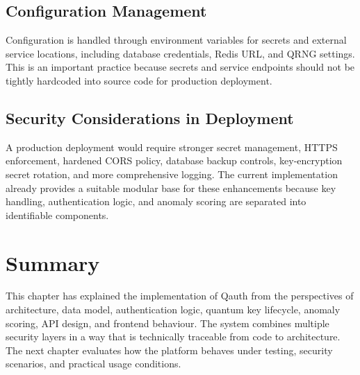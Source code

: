 \subsection{Configuration Management}
Configuration is handled through environment variables for secrets and external service locations, including database credentials, Redis URL, and QRNG settings. This is an important practice because secrets and service endpoints should not be tightly hardcoded into source code for production deployment.

\subsection{Security Considerations in Deployment}
A production deployment would require stronger secret management, HTTPS enforcement, hardened CORS policy, database backup controls, key-encryption secret rotation, and more comprehensive logging. The current implementation already provides a suitable modular base for these enhancements because key handling, authentication logic, and anomaly scoring are separated into identifiable components.

\section{Summary}
This chapter has explained the implementation of Qauth from the perspectives of architecture, data model, authentication logic, quantum key lifecycle, anomaly scoring, API design, and frontend behaviour. The system combines multiple security layers in a way that is technically traceable from code to architecture. The next chapter evaluates how the platform behaves under testing, security scenarios, and practical usage conditions.

